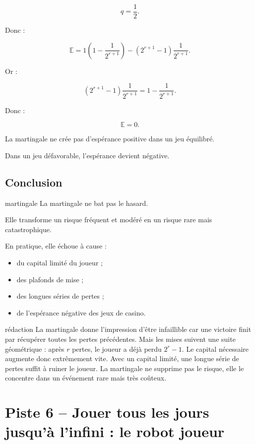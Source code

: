 \documentclass[11pt,a4paper]{article}
\newcommand{\E}{\mathbb{E}}
\begin{document}
\[
q=\frac12.
\]

Donc :

\[
\E=1\left(1-\frac{1}{2^{r+1}}\right)
-
(2^{r+1}-1)\frac{1}{2^{r+1}}.
\]

Or :

\[
(2^{r+1}-1)\frac{1}{2^{r+1}}
=
1-\frac{1}{2^{r+1}}.
\]

Donc :

\[
\E=0.
\]

La martingale ne crée pas d'espérance positive dans un jeu équilibré.

Dans un jeu défavorable, l'espérance devient négative.

\subsection{Conclusion}

\begin{conclusionbox}{martingale}
La martingale ne bat pas le hasard.

Elle transforme un risque fréquent et modéré en un risque rare mais catastrophique.

En pratique, elle échoue à cause :
\begin{itemize}
    \item du capital limité du joueur ;
    \item des plafonds de mise ;
    \item des longues séries de pertes ;
    \item de l'espérance négative des jeux de casino.
\end{itemize}
\end{conclusionbox}

\begin{oral}{rédaction}
La martingale donne l'impression d'être infaillible car une victoire finit par récupérer toutes les pertes précédentes. Mais les mises suivent une suite géométrique : après $r$ pertes, le joueur a déjà perdu $2^r-1$. Le capital nécessaire augmente donc extrêmement vite. Avec un capital limité, une longue série de pertes suffit à ruiner le joueur. La martingale ne supprime pas le risque, elle le concentre dans un événement rare mais très coûteux.
\end{oral}

\section{Piste 6 -- Jouer tous les jours jusqu'à l'infini : le robot joueur}
\end{document}

